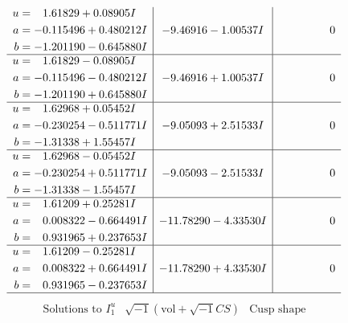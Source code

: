 \documentclass[1p]{elsarticle_modified}
\theoremstyle{definition}
\newcommand{\I}{\sqrt{-1}}
\begin{document}
$$\begin{array}{c|c|c}
\begin{aligned}
u &= \phantom{-}1.61829 + 0.08905 I \\
a &= -0.115496 + 0.480212 I \\
b &= -1.201190 - 0.645880 I\end{aligned}
 & -9.46916 - 1.00537 I & \phantom{-0.000000 } 0 \\ \hline\begin{aligned}
u &= \phantom{-}1.61829 - 0.08905 I \\
a &= -0.115496 - 0.480212 I \\
b &= -1.201190 + 0.645880 I\end{aligned}
 & -9.46916 + 1.00537 I & \phantom{-0.000000 } 0 \\ \hline\begin{aligned}
u &= \phantom{-}1.62968 + 0.05452 I \\
a &= -0.230254 - 0.511771 I \\
b &= -1.31338 + 1.55457 I\end{aligned}
 & -9.05093 + 2.51533 I & \phantom{-0.000000 } 0 \\ \hline\begin{aligned}
u &= \phantom{-}1.62968 - 0.05452 I \\
a &= -0.230254 + 0.511771 I \\
b &= -1.31338 - 1.55457 I\end{aligned}
 & -9.05093 - 2.51533 I & \phantom{-0.000000 } 0 \\ \hline\begin{aligned}
u &= \phantom{-}1.61209 + 0.25281 I \\
a &= \phantom{-}0.008322 - 0.664491 I \\
b &= \phantom{-}0.931965 + 0.237653 I\end{aligned}
 & -11.78290 - 4.33530 I & \phantom{-0.000000 } 0 \\ \hline\begin{aligned}
u &= \phantom{-}1.61209 - 0.25281 I \\
a &= \phantom{-}0.008322 + 0.664491 I \\
b &= \phantom{-}0.931965 - 0.237653 I\end{aligned}
 & -11.78290 + 4.33530 I & \phantom{-0.000000 } 0\\
 \hline 
 \end{array}$$\newpage$$\begin{array}{c|c|c}  
\text{Solutions to }I^u_{1}& \I (\text{vol} + \sqrt{-1}CS) & \text{Cusp shape}\\
 \hline 
\begin{aligned}

\end{aligned}
\end{array}$$
\end{document}
